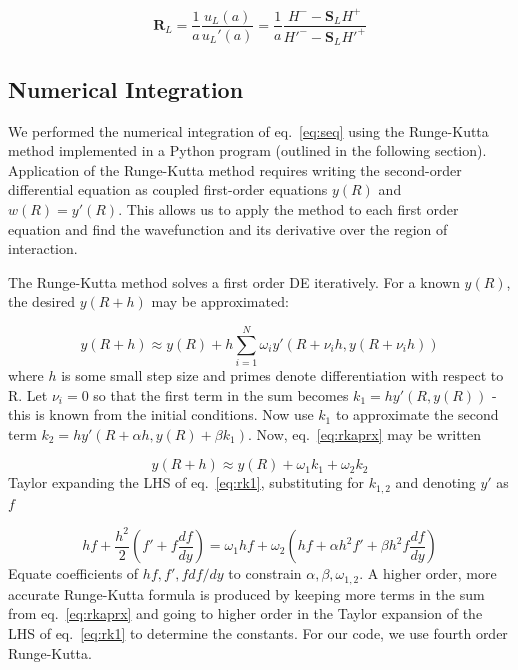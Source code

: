 \documentclass[]{scrartcl}
\begin{document}
\begin{equation}
	\mathbf{R}_L = \frac{1}{a} \frac{u _L (a)}{u _L ' (a)} = \frac{1}{a} \frac{H^- - \mathbf{S}_L H^+}{H'^- - \mathbf{S}_L H' ^+}
	\label{eq:rmtx}
\end{equation}

\subsection*{Numerical Integration}

We performed the numerical integration of eq.~\ref{eq:seq} using the Runge-Kutta method implemented in a Python program (outlined in the following section). Application of the Runge-Kutta method requires writing the second-order differential equation as coupled first-order equations $y(R)$ and $w(R) = y'(R)$. This allows us to apply the method to each first order equation and find the wavefunction and its derivative over the region of interaction.

The Runge-Kutta method solves a first order DE iteratively. For a known $y(R)$, the desired $y(R+h)$ may be approximated:

\begin{equation}
	y(R+h) \approx y(R) + h \sum_{i=1}^N \omega_i y'(R + \nu_i h,y(R + \nu_ih))
	\label{eq:rkaprx}
\end{equation}
where $h$ is some small step size and primes denote differentiation with respect to R. Let $\nu_i =0$ so that the first term in the sum becomes $k_1 = h y' (R,y(R))$ - this is known from the initial conditions. Now use $k_1$ to approximate the second term $k_2 = h y' (R+\alpha h, y(R) + \beta k_1)$. Now, eq.~\ref{eq:rkaprx} may be written

\begin{equation}
	y(R+h) \approx y(R) + \omega_1 k_1 + \omega_2 k_2
	\label{eq:rk1}
\end{equation}
Taylor expanding the LHS of eq.~\ref{eq:rk1}, substituting for $k_{1,2}$ and denoting $y'$ as $f$

\begin{equation}
	hf + \frac{h^2}{2} \left ( f' + f \frac{df}{dy} \right ) = \omega_1 hf + \omega_2 \left  ( hf + \alpha h^2 f' + \beta h^2 f \frac{df}{dy} \right )
	\label{eq:rk2}
\end{equation}
Equate coefficients of $hf,f',f df/dy$ to constrain $\alpha, \beta, \omega_{1,2}$. A higher order, more accurate Runge-Kutta formula is produced by keeping more terms in the sum from eq.~\ref{eq:rkaprx} and going to higher order in the Taylor expansion of the LHS of eq.~\ref{eq:rk1} to determine the constants. For our code, we use fourth order Runge-Kutta.
\end{document}
